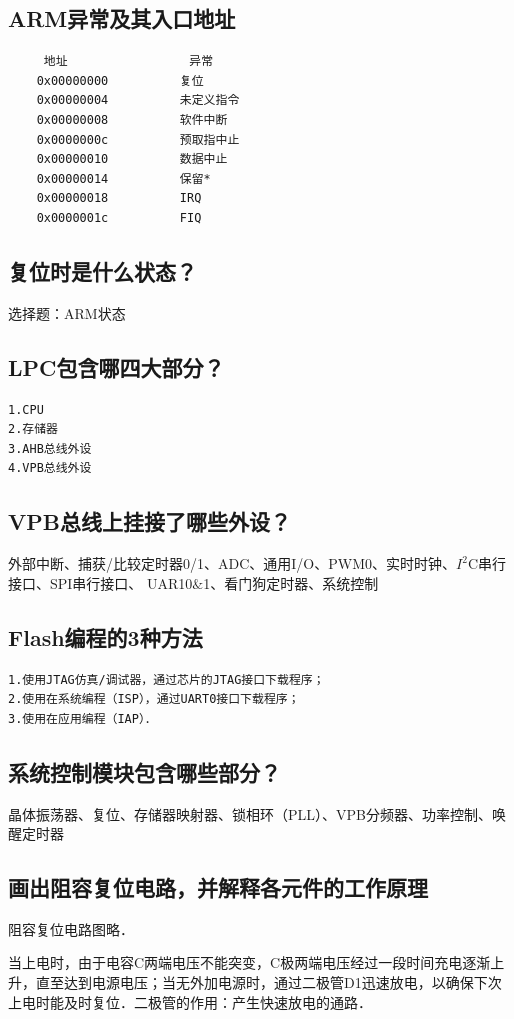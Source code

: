 \documentclass[cn,11pt]{elegantbook}
\begin{document}
\subsection{ARM异常及其入口地址}
\begin{lstlisting}
	 地址			    	异常
	0x00000000			复位
	0x00000004			未定义指令
	0x00000008			软件中断
	0x0000000c			预取指中止
	0x00000010			数据中止
	0x00000014			保留*
	0x00000018			IRQ
	0x0000001c			FIQ
\end{lstlisting}
\subsection{复位时是什么状态？}
选择题：ARM状态


\subsection{LPC包含哪四大部分？}
\begin{lstlisting}
1.CPU
2.存储器
3.AHB总线外设
4.VPB总线外设
\end{lstlisting}
\subsection{VPB总线上挂接了哪些外设？}
外部中断、捕获/比较定时器0/1、ADC、通用I/O、PWM0、实时时钟、$I^2$C串行接口、SPI串行接口、
UAR10$\&$1、看门狗定时器、系统控制
\subsection{Flash编程的3种方法}

\begin{lstlisting}
1.使用JTAG仿真/调试器，通过芯片的JTAG接口下载程序；
2.使用在系统编程（ISP），通过UART0接口下载程序；
3.使用在应用编程（IAP）．
\end{lstlisting}


\subsection{系统控制模块包含哪些部分？}
晶体振荡器、复位、存储器映射器、锁相环（PLL）、VPB分频器、功率控制、唤醒定时器
\subsection{画出阻容复位电路，并解释各元件的工作原理}
阻容复位电路图略．

当上电时，由于电容C两端电压不能突变，C极两端电压经过一段时间充电逐渐上升，直至达到电源电压；当无外加电源时，通过二极管D1迅速放电，以确保下次上电时能及时复位．二极管的作用：产生快速放电的通路．
\end{document}
